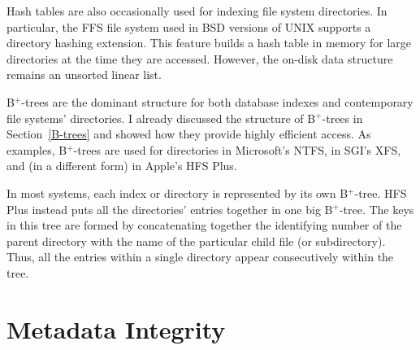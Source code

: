 Hash tables are also occasionally used for indexing file system
directories.  In particular, the FFS file system used in BSD versions
of UNIX supports a directory hashing extension.  This feature builds a
hash table in memory for large directories at the time they are
accessed.  However, the on-disk data structure remains an unsorted
linear list.

B${}^+$-trees are the dominant structure for both database indexes and
contemporary file systems' directories.  I already discussed the
structure of B${}^+$-trees in Section~\ref{B-trees} and showed how they
provide highly efficient access.  As examples, B${}^+$-trees are used for
directories in Microsoft's NTFS, in SGI's XFS, and (in a different
form) in Apple's HFS Plus.

In most systems, each index or directory is represented by its own
B${}^+$-tree.  HFS Plus instead puts all the directories' entries together
in one big B${}^+$-tree.  The keys in this tree are formed by concatenating
together the identifying number of the parent directory with the name
of the particular child file (or subdirectory).  Thus, all the entries
within a single directory appear consecutively within the tree.

\section{Metadata Integrity}\label{metadata-integrity-section}

